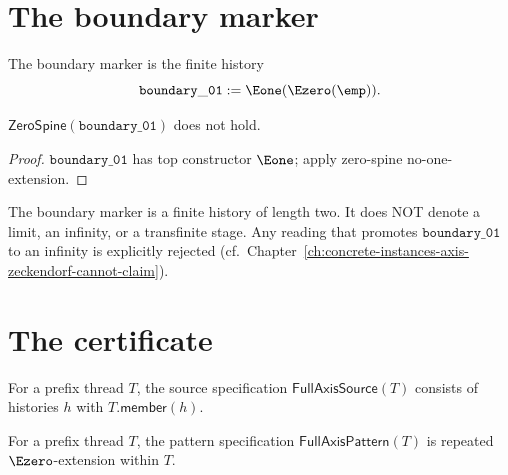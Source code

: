 \section{The boundary marker}

\begin{definition}
\label{def:axiszeckendorf-boundary-01}
The boundary marker is the finite history
$$
  \mathtt{boundary\_01}
  := \Eone(\Ezero(\emp)).
$$
\end{definition}

\begin{theorem}
\label{thm:boundary-01-not-zero-spine}
\(\mathsf{ZeroSpine}(\mathtt{boundary\_01})\) does not hold.
\end{theorem}
\begin{proof}
\(\mathtt{boundary\_01}\) has top constructor \(\Eone\); apply zero-spine no-one-extension.
\end{proof}

\begin{remark}
The boundary marker is a finite history of length two. It does NOT denote a limit, an infinity, or a transfinite stage. Any reading that promotes \(\mathtt{boundary\_01}\) to an infinity is explicitly rejected (cf.\ Chapter~\ref{ch:concrete-instances-axis-zeckendorf-cannot-claim}).
\end{remark}

\section{The certificate}

\begin{definition}
\label{def:fullaxis-source-specification}
For a prefix thread \(T\), the source specification \(\mathsf{FullAxisSource}(T)\) consists of histories \(h\) with \(T.\mathsf{member}(h)\).
\end{definition}

\begin{definition}
\label{def:fullaxis-pattern-specification}
For a prefix thread \(T\), the pattern specification \(\mathsf{FullAxisPattern}(T)\) is repeated \(\Ezero\)-extension within \(T\).
\end{definition}


